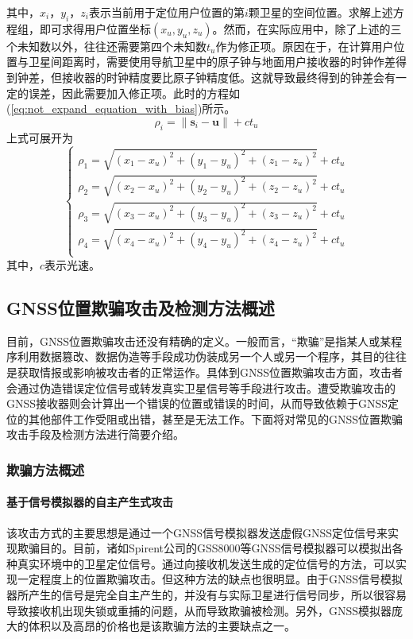 其中，$x_i$，$y_i$，$z_i$表示当前用于定位用户位置的第$i$颗卫星的空间位置。求解上述方程组，即可求得用户位置坐标$(x_u,y_u,z_u)$。然而，在实际应用中，除了上述的三个未知数以外，往往还需要第四个未知数$t_u$作为修正项。原因在于，在计算用户位置与卫星间距离时，需要使用导航卫星中的原子钟与地面用户接收器的时钟作差得到钟差，但接收器的时钟精度要比原子钟精度低。这就导致最终得到的钟差会有一定的误差，因此需要加入修正项。此时的方程如(\ref{eq:not_expand_equation_with_bias})所示。
\begin{equation}
    \rho_i=\|\textbf{s}_i-\textbf{u}\|+ct_u
    \label{eq:not_expand_equation_with_bias}
\end{equation}
上式可展开为
\begin{equation}
    \begin{cases}
        \rho_1=\sqrt{(x_1-x_u)^2+(y_1-y_u)^2+(z_1-z_u)^2}+ct_u\\
        \rho_2=\sqrt{(x_2-x_u)^2+(y_2-y_u)^2+(z_2-z_u)^2}+ct_u\\
        \rho_3=\sqrt{(x_3-x_u)^2+(y_3-y_u)^2+(z_3-z_u)^2}+ct_u\\
        \rho_4=\sqrt{(x_4-x_u)^2+(y_4-y_u)^2+(z_4-z_u)^2}+ct_u\\
    \end{cases}
    \label{eq:2}
\end{equation}
其中，$c$表示光速。
\subsection{GNSS位置欺骗攻击及检测方法概述}
目前，GNSS位置欺骗攻击还没有精确的定义。一般而言，“欺骗”是指某人或某程序利用数据篡改、数据伪造等手段成功伪装成另一个人或另一个程序，其目的往往是获取情报或影响被攻击者的正常运作。具体到GNSS位置欺骗攻击方面，攻击者会通过伪造错误定位信号或转发真实卫星信号等手段进行攻击。遭受欺骗攻击的GNSS接收器则会计算出一个错误的位置或错误的时间，从而导致依赖于GNSS定位的其他部件工作受阻或出错，甚至是无法工作。下面将对常见的GNSS位置欺骗攻击手段及检测方法进行简要介绍。
\subsubsection{欺骗方法概述}
\paragraph{基于信号模拟器的自主产生式攻击}

该攻击方式的主要思想是通过一个GNSS信号模拟器发送虚假GNSS定位信号来实现欺骗目的。目前，诸如Spirent公司的GSS8000等GNSS信号模拟器可以模拟出各种真实环境中的卫星定位信号。通过向接收机发送生成的定位信号的方法，可以实现一定程度上的位置欺骗攻击。但这种方法的缺点也很明显。由于GNSS信号模拟器所产生的信号是完全自主产生的，并没有与实际卫星进行信号同步，所以很容易导致接收机出现失锁或重捕的问题，从而导致欺骗被检测。另外，GNSS模拟器庞大的体积以及高昂的价格也是该欺骗方法的主要缺点之一\cite{庞晶2016GNSS}。
